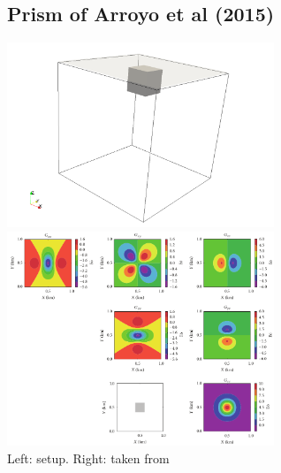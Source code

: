\subsection*{Prism of Arroyo et al (2015)}

\begin{center}
\includegraphics[width=8cm]{python_codes/fieldstone_84/arct15/setup}
\includegraphics[width=8cm]{python_codes/fieldstone_84/arct15/arct15.png}\\
{\captionfont Left: setup. Right: taken from \cite{arct15}}
\end{center}


